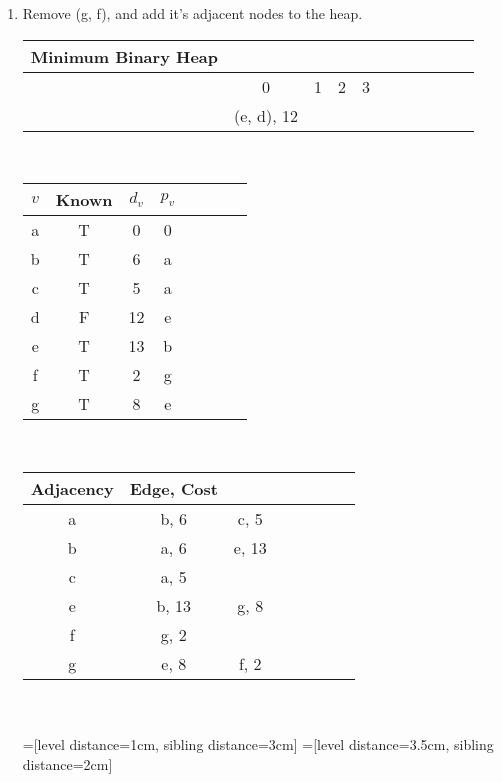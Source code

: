\documentclass[11pt]{article}
\begin{document}
\begin{enumerate}
\begin{enumerate}
\item Remove (g, f), and add it's adjacent nodes to the heap.\\
\begin{tabular}{ccccccccccc}
Minimum Binary Heap\\\hline
&0&1&2&3\\
&(e, d), 12 \\
\end{tabular}\\
\begin{tabular}{c|ccccccc|}
$v$& Known& $d_v$ & $p_v$\\\hline
a&T & 0 & 0\\
b&T & 6 & a\\
c&T & 5 & a\\
d&F & 12 & e\\
e&T & 13 & b\\
f&T & 2 & g\\
g&T & 8 & e
\end{tabular}\\
\begin{tabular}{c|ccccccc|}
Adjacency& Edge, Cost\\\hline
a& b, 6 & c, 5\\
b&a, 6&e, 13\\
c&a, 5&\\
e&b, 13& g, 8\\
f& g, 2\\
g& e, 8& f, 2\\
\end{tabular}\\
\\
=[level distance=1cm, sibling distance=3cm]
=[level distance=3.5cm, sibling distance=2cm]


\end{enumerate}
\end{enumerate}
\end{document}

